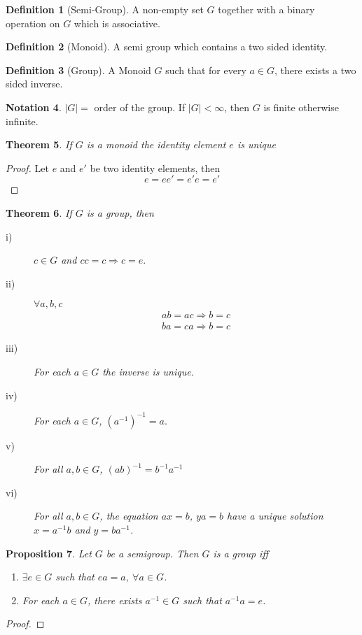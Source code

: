 \documentclass[leqno,DIV=calc,paper=a4,fontsize=11pt]{article}
\newtheorem{thm}{Theorem}[section]
\newtheorem{prop}[thm]{Proposition}
\theoremstyle{definition}
\newtheorem{defn}[thm]{Definition}
\newtheorem{notn}[thm]{Notation}
\theoremstyle{plain}
\theoremstyle{remark}
\begin{document}
\begin{defn}[Semi-Group]
A non-empty set $G$ together with a binary operation on $G$ which is associative.
\end{defn}

\begin{defn}[Monoid]
A semi group which contains a two sided identity.
\end{defn}

\begin{defn}[Group]
A Monoid $G$ such that for every $a\in G$, there exists a two sided inverse.
\end{defn}

\begin{notn}
$|G|=$ order of the group. If $|G|<\infty$, then $G$ is finite otherwise infinite.
\end{notn}

\begin{thm}
If $G$ is a monoid the identity element $e$ is unique
\end{thm}

\begin{proof}
Let $e$ and $e'$ be two identity elements, then
$$e=ee'=e'e=e'$$
\end{proof}

\begin{thm}
If $G$ is a group, then
\begin{description}
  \item[i)] $c\in G$ and $cc=c\Rightarrow c=e.$
  \item[ii)] $\forall a,b,c$
  \begin{align*}
  ab=ac\Rightarrow b=c\tag{Left cancelation}\\
  ba=ca\Rightarrow b=c\tag{Right cancelation}
  \end{align*}
  \item[iii)] For each $a\in G$ the inverse is unique.
  \item[iv)] For each $a\in G$, $(a^{-1})^{-1}=a.$
  \item[v)] For all $a,b\in G$, $(ab)^{-1}=b^{-1}a^{-1}$
  \item[vi)] For all $a,b\in G$, the equation $ax=b$, $ya=b$ have a unique solution $x=a^{-1}b$ and $y=ba^{-1}$.
\end{description}
\end{thm}

\begin{prop}
Let $G$ be a semigroup. Then $G$ is a group iff
\begin{enumerate}
  \item $\exists e\in G$ such that $ea=a,\ \forall a\in G$.
  \item For each $a\in G$, there exists $a^{-1}\in G$ such that $a^{-1}a=e$.
\end{enumerate}
\end{prop}
\begin{proof}

\end{proof}
\end{document}

